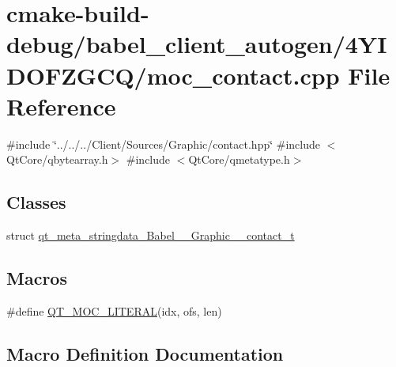 \hypertarget{cmake-build-debug_2babel__client__autogen_24YIDOFZGCQ_2moc__contact_8cpp}{}\section{cmake-\/build-\/debug/babel\+\_\+client\+\_\+autogen/4\+Y\+I\+D\+O\+F\+Z\+G\+C\+Q/moc\+\_\+contact.cpp File Reference}
\label{cmake-build-debug_2babel__client__autogen_24YIDOFZGCQ_2moc__contact_8cpp}
{\ttfamily \#include \char`\"{}../../../\+Client/\+Sources/\+Graphic/contact.\+hpp\char`\"{}}\newline
{\ttfamily \#include $<$Qt\+Core/qbytearray.\+h$>$}\newline
{\ttfamily \#include $<$Qt\+Core/qmetatype.\+h$>$}\newline
\subsection*{Classes}
\begin{DoxyCompactItemize}
\item 
struct \hyperlink{structqt__meta__stringdata__Babel____Graphic____contact__t}{qt\+\_\+meta\+\_\+stringdata\+\_\+\+Babel\+\_\+\+\_\+\+Graphic\+\_\+\+\_\+contact\+\_\+t}
\end{DoxyCompactItemize}
\subsection*{Macros}
\begin{DoxyCompactItemize}
\item 
\#define \hyperlink{cmake-build-debug_2babel__client__autogen_24YIDOFZGCQ_2moc__contact_8cpp_a75bb9482d242cde0a06c9dbdc6b83abe}{Q\+T\+\_\+\+M\+O\+C\+\_\+\+L\+I\+T\+E\+R\+AL}(idx,  ofs,  len)
\end{DoxyCompactItemize}


\subsection{Macro Definition Documentation}
\mbox{\label{cmake-build-debug_2babel__client__autogen_24YIDOFZGCQ_2moc__contact_8cpp_a75bb9482d242cde0a06c9dbdc6b83abe}} 

